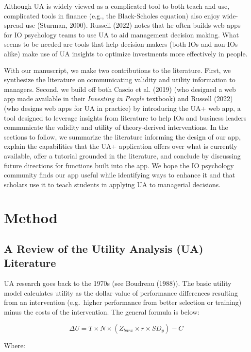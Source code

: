 \documentclass[
  english,
  man]{apa6}
\begin{document}
Although UA is widely viewed as a complicated tool to both teach and use, complicated tools in finance (e.g., the Black-Scholes equation) also enjoy wide-spread use (Sturman, 2000). Russell (2022) notes that he often builds web apps for IO psychology teams to use UA to aid management decision making. What seems to be needed are tools that help decision-makers (both IOs and non-IOs alike) make use of UA insights to optimize investments more effectively in people.

With our manuscript, we make two contributions to the literature. First, we synthesize the literature on communicating validity and utility information to managers. Second, we build off both Cascio et al. (2019) (who designed a web app made available in their \emph{Investing in People} textbook) and Russell (2022) (who designs web apps for UA in practice) by introducing the UA+ web app, a tool designed to leverage insights from literature to help IOs and business leaders communicate the validity and utility of theory-derived interventions. In the sections to follow, we summarize the literature informing the design of our app, explain the capabilities that the UA+ application offers over what is currently available, offer a tutorial grounded in the literature, and conclude by discussing future directions for functions built into the app. We hope the IO psychology community finds our app useful while identifying ways to enhance it and that scholars use it to teach students in applying UA to managerial decisions.

\section{Method}\label{method}

\subsection{A Review of the Utility Analysis (UA) Literature}\label{a-review-of-the-utility-analysis-ua-literature}

UA research goes back to the 1970s (see Boudreau (1988)). The basic utility model calculates utility as the dollar value of performance differences resulting from an intervention (e.g.~higher performance from better selection or training) minus the costs of the intervention. The general formula is below:

\[\Delta U = T \times N \times (Z_{barx} \times r \times SD_y) - C\]

Where:
\end{document}
